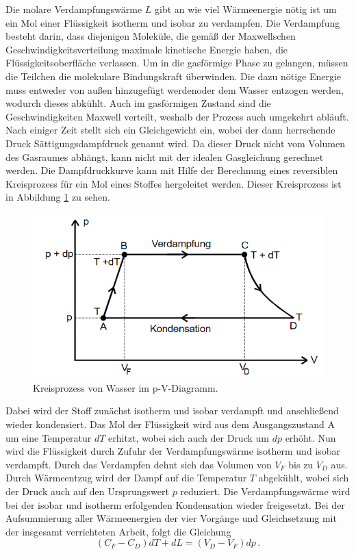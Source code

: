 Die molare Verdampfungswärme $L$ gibt an wie viel Wärmeenergie nötig ist um ein Mol einer Flüssigkeit isotherm und isobar zu verdampfen. 
Die Verdampfung besteht darin, dass diejenigen Moleküle, die gemäß der Maxwellschen Geschwindigkeitsverteilung maximale kinetische Energie haben, die Flüssigkeitsoberfläche verlassen.
Um in die gasförmige Phase zu gelangen, müssen die Teilchen die molekulare Bindungskraft überwinden. Die dazu nötige Energie muss entweder von außen hinzugefügt werdenoder dem Wasser entzogen werden, wodurch dieses abkühlt.
Auch im gasförmigen Zustand sind die Geschwindigkeiten Maxwell verteilt, weshalb der Prozess auch umgekehrt abläuft. Nach einiger Zeit stellt sich ein Gleichgewicht ein, wobei der dann herrschende Druck 
Sättigungsdampfdruck genannt wird. Da dieser Druck nicht vom Volumen des Gasraumes abhängt, kann nicht mit der idealen Gasgleichung gerechnet werden.
Die Dampfdruckkurve kann mit Hilfe der Berechnung eines reversiblen Kreisprozess für ein Mol eines Stoffes hergeleitet werden. Dieser Kreisprozess ist in Abbildung \ref{fig:kreis} zu sehen.
\begin{figure}
    \centering
    \caption{Kreisprozess von Wasser im p-V-Diagramm.\cite{v203}}
    \label{fig:kreis}
    \includegraphics[width = 0.6 \textwidth]{pics/kreis.png}
\end{figure}
Dabei wird der Stoff zunächst isotherm und isobar verdampft und anschließend wieder kondensiert. Das Mol der Flüssigkeit wird aus dem Ausgangszustand A um eine Temperatur
$dT$ erhitzt, wobei sich auch der Druck um $dp$ erhöht. Nun wird die Flüssigkeit durch Zufuhr der Verdampfungswärme isotherm und isobar verdampft. Durch das Verdampfen
dehnt sich das Volumen von $V_F$ bis zu $V_D$ aus. Durch Wärmeentzug wird der Dampf auf die Temperatur $T$ abgekühlt, wobei sich der Druck auch auf den Ursprungswert $p$ reduziert.
Die Verdampfungswärme wird bei der isobar und isotherm erfolgenden Kondensation wieder freigesetzt. Bei der Aufsummierung aller Wärmeenergien der vier Vorgänge und
Gleichsetzung mit der insgesamt verrichteten Arbeit, folgt die Gleichung 
\begin{equation}
    (C_F-C_D) dT + dL = (V_D-V_F)dp \, .
\end{equation}
